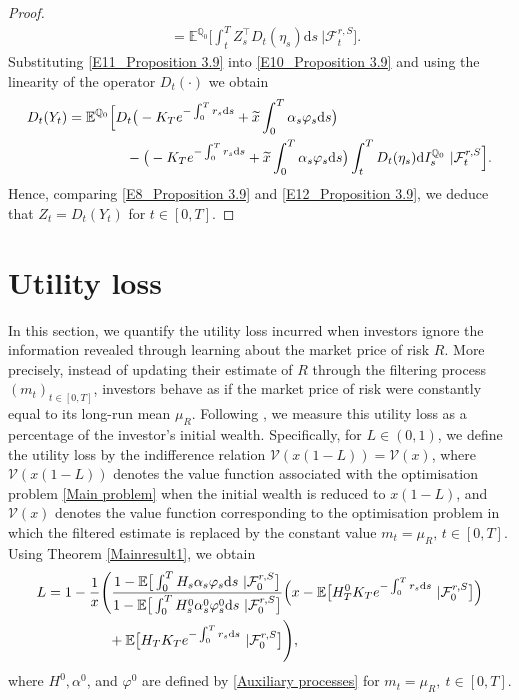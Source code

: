 \documentclass[12,reqno]{amsart}
\numberwithin{equation}{section}
\begin{document}
\begin{proof}
\begin{align}
		&=\mathbb{E}^{\mathbb{Q}_{0}}\Big[\int_{t}^{T}Z_{s}^{\top}D_{t}(\eta_{s})\mathrm{d}s~|\mathcal{F}_{t}^{r,S}\Big].
	\end{align}
	Substituting \eqref{E11_Proposition 3.9} into \eqref{E10_Proposition 3.9} and using the linearity of the operator $D_{t}(\cdot)$ we obtain
	\begin{align}\label{E12_Proposition 3.9}
		D_{t}(Y_{t})&=\mathbb{E}^{\mathbb{Q}_{0}}\Big[D_{t}\big(-K_{T}e^{-\int_{0}^{T}r_{s}\mathrm{d}s}+\widetilde{x}\int_{0}^{T}\alpha_{s}\varphi_{s}\mathrm{d}s\big)\notag\\
		&\phantom{XXXXx}-\big(-K_{T}e^{-\int_{0}^{T}r_{s}\mathrm{d}s}+\widetilde{x}\int_{0}^{T}\alpha_{s}\varphi_{s}\mathrm{d}s\big)\int_{t}^{T}D_{t}(\eta_{s})\mathrm{d}I_{s}^{\mathbb{Q}_{0}}~|\mathcal{F}_{t}^{r,S}\Big].
	\end{align}
	Hence, comparing \eqref{E8_Proposition 3.9} and \eqref{E12_Proposition 3.9}, we deduce that $Z_{t}=D_{t}(Y_{t})$ for $t\in[0,T]$.
\end{proof}

\section{Utility loss}\label{Welfare loss}
In this section, we quantify the utility loss incurred when investors ignore the information revealed through learning about the market price of risk $R$. More precisely, instead of updating their estimate of $R$ through the filtering process $(m_{t})_{t\in[0,T]}$, investors behave as if the market price of risk were constantly equal to its long-run mean $\mu_{R}$. Following \cite{escobar2016portfolio}, we measure this utility loss as a percentage of the investor's initial wealth. Specifically, for $L\in(0,1)$, we define the utility loss by the indifference relation $\mathcal{V}(x(1-L))=\mathcal{V}(x)$, where $\mathcal{V}(x(1-L))$ denotes the value function associated with the optimisation problem \eqref{Main problem} when the initial wealth is reduced to $x(1-L)$, and $\mathcal{V}(x)$ denotes the value function corresponding to the optimisation problem in which the filtered estimate is replaced by the constant value $m_{t}=\mu_{R},\,t\in[0,T]$. Using Theorem \ref{Mainresult1}, we obtain
\begin{align*}
	L&=1-\frac{1}{x}\Bigg(\frac{1-\mathbb{E}\big[\int_{0}^{T}H_{s}\alpha_{s}\varphi_{s}\mathrm{d}s~|\mathcal{F}_{0}^{r,S}\big]}{1-\mathbb{E}\big[\int_{0}^{T}H_{s}^{0}\alpha_{s}^{0}\varphi_{s}^{0}\mathrm{d}s~|\mathcal{F}_{0}^{r,S}\big]}\Big(x-\mathbb{E}\big[H_{T}^{0}K_{T}e^{-\int_{0}^{T}r_{s}\mathrm{d}s}~|\mathcal{F}_{0}^{r,S}\big]\Big)\notag\\
	&\phantom{XXXxxx}+\mathbb{E}\big[H_{T}K_{T}e^{-\int_{0}^{T}r_{s}\mathrm{d}s}~|\mathcal{F}_{0}^{r,S}\big]\Bigg),
\end{align*}
where $H^{0},\alpha^{0}$, and $\varphi^{0}$ are defined by \eqref{Auxiliary processes} for $m_{t}=\mu_{R},~t\in[0,T]$.
\end{document}
